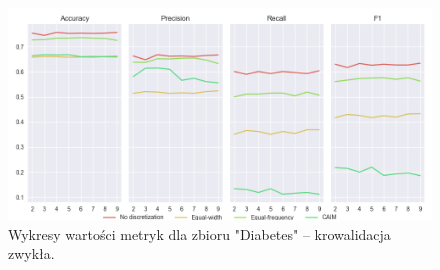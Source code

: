 \begin{figure}[H]
    \includegraphics[width=\textwidth]{img/cv_scores_kfold/scoring_kfold_diabetes.png}
    \caption{Wykresy wartości metryk dla zbioru "Diabetes" -- krowalidacja zwykła.}
\end{figure}

